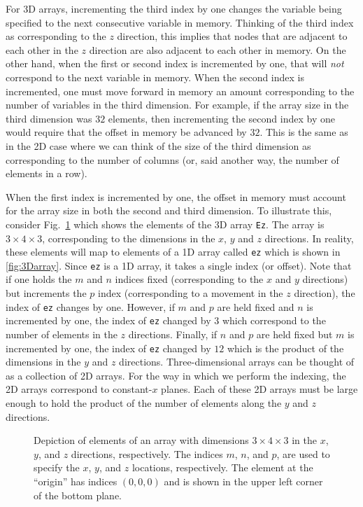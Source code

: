 For 3D arrays, incrementing the third index by one changes the
variable being specified to the next consecutive variable in memory.
Thinking of the third index as corresponding to the $z$ direction,
this implies that nodes that are adjacent to each other in the $z$
direction are also adjacent to each other in memory.  On the other
hand, when the first or second index is incremented by one, that will
{\em not} correspond to the next variable in memory.  When the second
index is incremented, one must move forward in memory an amount
corresponding to the number of variables in the third dimension.  For
example, if the array size in the third dimension was $32$ elements,
then incrementing the second index by one would require that the
offset in memory be advanced by $32$.  This is the same as in the 2D
case where we can think of the size of the third dimension as
corresponding to the number of columns (or, said another way, the
number of elements in a row).

When the first index is incremented by one, the offset in memory must
account for the array size in both the second and third dimension. To
illustrate this, consider Fig.\ \ref{fig:3Dmacro} which shows the
elements of the 3D array {\tt Ez}.  The array is $3\times 4\times 3$,
corresponding to the dimensions in the $x$, $y$ and $z$ directions.
In reality, these elements will map to elements of a 1D array called
{\tt ez} which is shown in \ref{fig:3Darray}.  Since {\tt ez} is a 1D
array, it takes a single index (or offset).  Note that if one holds
the $m$ and $n$ indices fixed (corresponding to the $x$ and $y$
directions) but increments the $p$ index (corresponding to a movement
in the $z$ direction), the index of {\tt ez} changes by one.  However,
if $m$ and $p$ are held fixed and $n$ is incremented by one, the index
of {\tt ez} changed by $3$ which correspond to the number of elements
in the $z$ directions.  Finally, if $n$ and $p$ are held fixed but $m$
is incremented by one, the index of {\tt ez} changed by $12$ which is
the product of the dimensions in the $y$ and $z$ directions.
Three-dimensional arrays can be thought of as a collection of 2D
arrays.  For the way in which we perform the indexing, the 2D arrays
correspond to constant-$x$ planes.  Each of these 2D arrays must be
large enough to hold the product of the number of elements along the
$y$ and $z$ directions.

\begin{figure}
  \begin{center}
  \end{center} \caption{Depiction of elements of an array with
  dimensions $3\times 4\times 3$ in the $x$, $y$, and $z$ directions,
  respectively.  The indices $m$, $n$, and $p$, are used to specify
  the $x$, $y$, and $z$ locations, respectively.  The element at the
  ``origin'' has indices $(0,0,0)$ and is shown in the upper left
  corner of the bottom plane.}  \label{fig:3Dmacro}
\end{figure}

